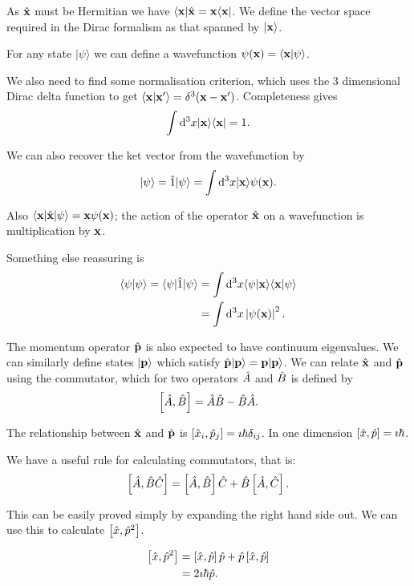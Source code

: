 \documentclass{notes}
\newcommand{\bra}[1]{\langle#1|}
\newcommand{\ket}[1]{|#1\rangle}
\newcommand{\scp}[2]{\langle#1|#2\rangle}
\newcommand{\com}[2]{\left[#1,#2\right]}
\begin{document}
As $\Hat{\mathbf{x}}$ must be Hermitian we have $\bra{\vect{x}}
\Hat{\vect{x}} = \vect{x} \bra{\vect{x}}$.  We define the vector space
required in the Dirac formalism as that spanned by $\ket{\vect{x}}$.

For any state $\ket{\psi}$ we can define a wavefunction
$\psi(\vect{x}) = \scp{\vect{x}}{\psi}$.

We also need to find some normalisation criterion, which uses the 3
dimensional Dirac delta function to get
$\scp{\vect{x}}{\vect{x'}} = \delta^3(\vect{x} - \vect{x'})$.  Completeness
gives
\[
\int \ud^3 x \ket{\vect{x}} \bra{\vect{x}} = 1.
\]

We can also recover the ket vector from the wavefunction by
\[
\ket{\psi} = \Hat{1} \ket{\psi} = \int \ud^3 x \ket{\vect{x}} \psi(\vect{x}).
\]

Also $\bra{\vect{x}} \Hat{\vect{x}} \ket{\psi} = \vect{x} \psi(\vect{x})$;
the action of the operator $\Hat{\mathbf{x}}$ on a wavefunction is multiplication
by $\mathbf{x}$.

Something else reassuring is
\begin{align*}
\scp{\psi}{\psi} = \bra{\psi} \Hat{1} \ket{\psi}
& = \int \ud^3 x \scp{\psi}{\vect{x}} \scp{\vect{x}}{\psi} \\
& = \int \ud^3 x \abs{\psi(\vect{x})}^2.
\end{align*}

The momentum operator $\Hat{\mathbf{p}}$ is also expected to have continuum
eigenvalues.  We can similarly define states $\ket{\vect{p}}$ which
satisfy $\Hat{\vect{p}} \ket{\vect{p}} = \vect{p} \ket{\vect{p}}$.  We
can relate $\Hat{\mathbf{x}}$ and $\Hat{\mathbf{p}}$ using the commutator,
which for two operators $\Hat{A}$ and $\Hat{B}$ is defined by
\[
\com{\Hat{A}}{\Hat{B}} = \Hat{A} \Hat{B} - \Hat{B} \Hat{A}.
\]

The relationship between $\Hat{\mathbf{x}}$ and $\Hat{\mathbf{p}}$ is
$\com{\Hat{x}_i}{\Hat{p}_j} = \imath \hbar \delta_{i j}$.  In one dimension
$\com{\Hat{x}}{\Hat{p}} = \imath \hbar$.

We have a useful rule for calculating commutators, that is:
\[
\com{\Hat{A}}{\Hat{B}{\Hat{C}}}
= \com{\Hat{A}}{\Hat{B}} \Hat{C} + \Hat{B} \com{\Hat{A}}{\Hat{C}}.
\]

This can be easily proved simply by expanding the right hand side out.
We can use this to calculate $\com{\Hat{x}}{\Hat{p}^2}$.

\begin{align*}
\com{\Hat{x}}{\Hat{p}^2} &= \com{\Hat{x}}{\Hat{p}} \Hat{p}
+ \Hat{p} \com{\Hat{x}}{\Hat{p}} \\
&= 2 \imath \hbar \Hat{p}.
\end{align*}
\end{document}
